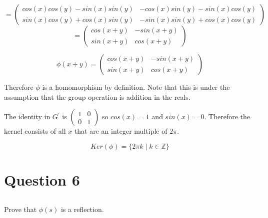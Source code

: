 \documentclass[a4paper,12pt]{article}
\numberwithin{equation}{section}
\begin{document}
\begin{equation*}
=\left( 
	\begin{array}{cc}
	cos(x)cos(y) - sin(x)sin(y) & -cos(x)sin(y) - sin(x)cos(y) \\
	sin(x)cos(y) + cos(x)sin(y)  & -sin(x)sin(y) + cos(x)cos(y)
	\end{array} 
\right)
\end{equation*}
\begin{equation}
= 
\left( 
	\begin{array}{cc}
	cos(x + y) & -sin(x + y) \\
	sin(x + y)  & cos(x + y)
	\end{array} 
\right)
\end{equation}

\begin{equation}
\phi(x + y) = \left( 
	\begin{array}{cc}
	cos(x + y) & -sin(x + y) \\
	sin(x + y)  & cos(x + y)
	\end{array} 
\right)
\end{equation}

Therefore $\phi$ is a homomorphism by definition. Note that this is under the assumption that the group operation is addition in the reals.

The identity in $G^{\prime}$ is $\left( 
	\begin{array}{cc}
	1 & 0 \\
	0  & 1
	\end{array} 
\right)$ so $cos(x) = 1$ and $sin(x) = 0$. Therefore the kernel consists of all $x$ that are an integer multiple of $2\pi$.

\begin{equation}
Ker(\phi) = \{ 2\pi k \mid k \in \mathbb{Z} \}
\end{equation}

\section{Question 6}

\subsection{}

Prove that $\phi(s)$ is a reflection.
\end{document}
